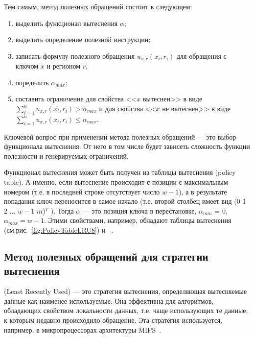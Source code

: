 Тем самым, метод полезных обращений состоит в следующем:
\begin{enumerate}
  \item выделить функционал вытеснения $\alpha$;
  \item выделить определение полезной инструкции;
  \item записать формулу полезного обращения $u_{x,r}(x_i, r_i)$ для обращения с ключом $x$ и регионом $r$;
  \item определить $\alpha_{max}$;
  \item составить ограничение для свойства <<$x$ вытеснен>> в виде
$\sum\limits_{i=1}^n u_{x,r}(x_i, r_i) > \alpha_{max}$ и для свойства <<$x$ не
вытеснен>> в виде $\sum\limits_{i=1}^n u_{x,r}(x_i,r_i) \leqslant \alpha_{max}$.
\end{enumerate}

Ключевой вопрос при применении метода полезных обращений --- это выбор
функционала вытеснения. От него в том числе будет зависеть сложность функции
полезности и генерируемых ограничений.

 Функционал вытеснения может быть получен из таблицы вытеснения
(policy table). А именно, если вытеснение происходит с позиции с максимальным
номером (т.е. в последней строке отсутствует число $w{-}1$), а в результате
попадания ключ переносится в самое начало (т.е. второй столбец имеет вид (0 1 2
... $w{-}1$ $m$)$^T$ ). Тогда $\alpha$ --- это позиция ключа в перестановке,
$\alpha_{min}$ = 0, $\alpha_{max} = w{-}1$. Этими свойствами, например, обладают
таблицы вытеснения \LRU (см.рис.~\ref{fig:PolicyTableLRU8}) и
\PseudoLRU~\cite{policy_tables}.



\subsection{Метод полезных обращений для стратегии вытеснения \LRU}

\LRU (Least Recently Used) --- это стратегия вытеснения,
определяющая вытесняемые данные как наименее используемые. Она
эффективна для алгоритмов, обладающих свойством локальности данных,
т.е. чаще использующих те данные, к которым недавно происходило
обращение. Эта стратегия используется, например, в микропроцессорах
архитектуры MIPS~\cite{mips64II}.

